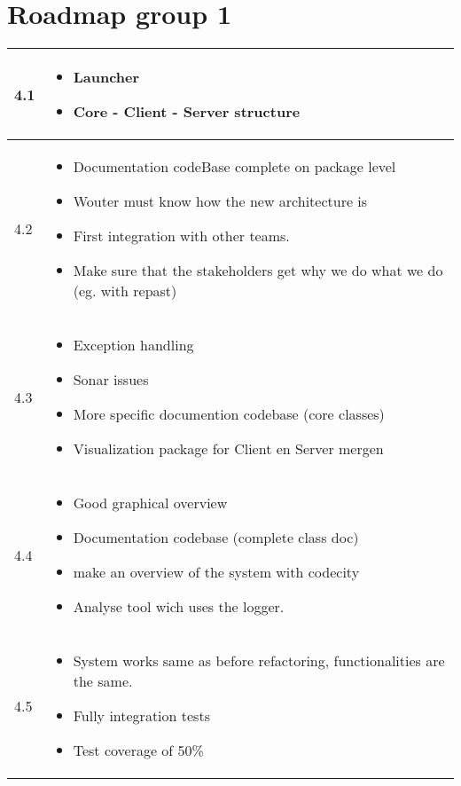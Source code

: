 \documentclass{article}
\begin{document}
\section*{Roadmap group 1}
\begin{center}
    \begin{tabular}{ | l | p{12cm} |}
    \hline
	4.1 & \begin{itemize}
	    	\item Launcher
	    	\item Core - Client - Server structure
    \end{itemize}     \\ \hline
    4.2 &
    \begin{itemize}
    	\item Documentation codeBase complete on package level
   		\item Wouter must know how the new architecture is
   		\item First integration with other teams.
   		\item Make sure that the stakeholders get why we do what we do (eg. with repast)
    \end{itemize}     \\ \hline
    4.3 & 
    \begin{itemize}
    	\item Exception handling
    	\item Sonar issues 
    	\item More specific documention codebase (core classes)
    	\item Visualization package for Client en Server mergen
	\end{itemize}   \\ \hline
    4.4 &
    \begin{itemize}
    	\item Good graphical overview
    	\item Documentation codebase (complete class doc)
    	\item  make an overview of the system with codecity
    	\item  Analyse tool wich uses the logger. 
    \end{itemize}
  \\ \hline
    4.5 &
    \begin{itemize}
    	\item System works same as before refactoring, functionalities are the same. 
    	\item Fully integration tests
    	\item Test coverage of 50\%
\end{itemize}    \\ \hline
    \end{tabular}
\end{center}
\end{document}
